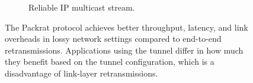 \begin{figure}[t]
\begin{subfigure}[b]{0.6\linewidth}
        \caption{Reliable IP multicast stream.}
        \label{fig:packrat:perf:multicast}
    \end{subfigure}
    \caption{The Packrat protocol achieves better throughput, latency, and link
     overheads in lossy network settings compared to end-to-end
     retransmissions. Applications using the tunnel differ in how much they
     benefit based on the tunnel configuration, which is a disadvantage of
     link-layer retransmissions.}
    \label{fig:packrat:perf}
\end{figure}